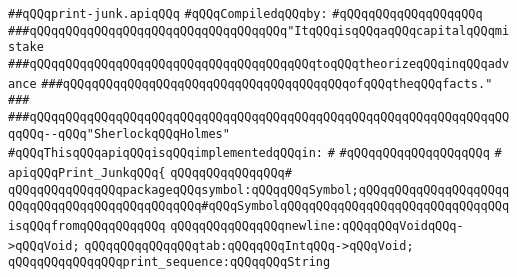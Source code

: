 \label{src/lib/compiler/front/basics/print/print-junk.api}
\verb|##qQQqprint-junk.apiqQQq|\newline
\newline
\verb|#qQQqCompiledqQQqby:|\newline
\verb|#qQQqqQQqqQQqqQQqqQQq|\newline
\newline
\newline
\newline
\verb|###qQQqqQQqqQQqqQQqqQQqqQQqqQQqqQQqqQQq"ItqQQqisqQQqaqQQqcapitalqQQqmistake|\newline
\verb|###qQQqqQQqqQQqqQQqqQQqqQQqqQQqqQQqqQQqqQQqtoqQQqtheorizeqQQqinqQQqadvance|\newline
\verb|###qQQqqQQqqQQqqQQqqQQqqQQqqQQqqQQqqQQqqQQqofqQQqtheqQQqfacts."|\newline
\verb|###|\newline
\verb|###qQQqqQQqqQQqqQQqqQQqqQQqqQQqqQQqqQQqqQQqqQQqqQQqqQQqqQQqqQQqqQQqqQQqqQQq--qQQq"SherlockqQQqHolmes"|\newline
\newline
\newline
\newline
\verb|#qQQqThisqQQqapiqQQqisqQQqimplementedqQQqin:|\newline
\verb|#|\newline
\verb|#qQQqqQQqqQQqqQQqqQQq|\newline
\verb|#|\newline
\verb|apiqQQqPrint_JunkqQQq{|\newline
\verb|qQQqqQQqqQQqqQQq#|\newline
\verb|qQQqqQQqqQQqqQQqpackageqQQqsymbol:qQQqqQQqSymbol;qQQqqQQqqQQqqQQqqQQqqQQqqQQqqQQqqQQqqQQqqQQqqQQq#qQQqSymbolqQQqqQQqqQQqqQQqqQQqqQQqqQQqqQQqisqQQqfromqQQqqQQqqQQq|\newline
\newline
\verb|qQQqqQQqqQQqqQQqnewline:qQQqqQQqVoidqQQq->qQQqVoid;|\newline
\verb|qQQqqQQqqQQqqQQqtab:qQQqqQQqIntqQQq->qQQqVoid;|\newline
\newline
\verb|qQQqqQQqqQQqqQQqprint_sequence:qQQqqQQqString|\newline
